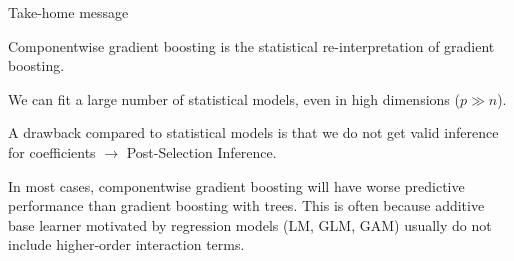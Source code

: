 

\begin{vbframe}{Take-home message}

Componentwise gradient boosting is the statistical re-interpretation of gradient boosting.

\lz

We can fit a large number of statistical models, even in high dimensions ($p \gg n$).

\lz

A drawback compared to statistical models is that we do not get valid inference for coefficients $\rightarrow$ Post-Selection Inference.

\lz

In most cases, componentwise gradient boosting will have worse predictive performance than gradient boosting with trees. This is often because additive base learner motivated by regression models (LM, GLM, GAM) usually do not include higher-order interaction terms.

\end{vbframe}

\endlecture

